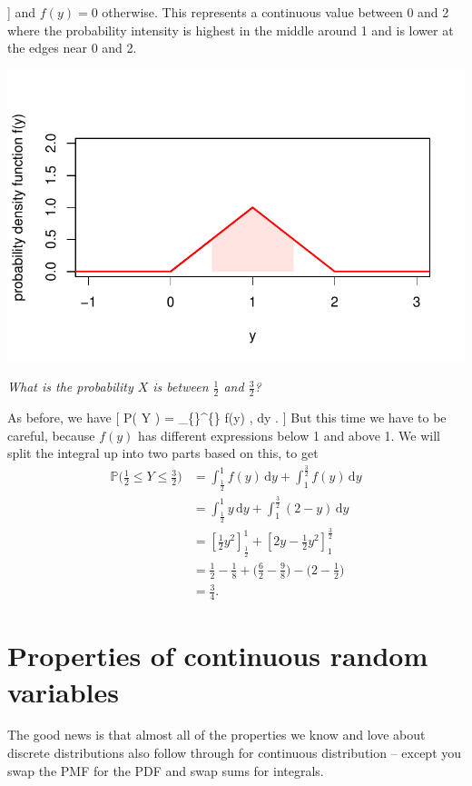 \documentclass[
  letterpaper,
  DIV=11,
  numbers=noendperiod]{scrreprt}
\theoremstyle{remark}
\begin{document}
{]} and \(f(y) = 0\) otherwise. This represents a continuous value
between 0 and 2 where the probability intensity is highest in the middle
around 1 and is lower at the edges near 0 and 2.

\includegraphics{sections/L15-continuous_files/figure-pdf/second-pdf-1.pdf}

\emph{What is the probability \(X\) is between \(\frac12\) and
\(\frac32\)?}

As before, we have {[} \mathbb P\big(  \leq Y \leq {}
\big) = \int\_\{\}\^{}\{\} f(y) , \mathrm dy . {]} But
this time we have to be careful, because \(f(y)\) has different
expressions below 1 and above 1. We will split the integral up into two
parts based on this, to get \begin{align*}
\mathbb P\big( \tfrac12 \leq Y \leq \tfrac32 \big) 
  &= \int_{\frac12}^{1} f(y) \, \mathrm dy + \int_{1}^{\frac32} f(y) \, \mathrm dy \\
    &= \int_{\frac12}^{1} y \, \mathrm dy + \int_{1}^{\frac32} (2-y) \, \mathrm dy \\
    &= \left[ \tfrac12 y^2\right]_{\frac12}^1 + \left[ 2y-\tfrac12 y^2\right]_1^{\frac32} \\
    &= \tfrac12 - \tfrac18 + \big(\tfrac62 - \tfrac98\big) - \big(2 - \tfrac12\big) \\
    &= \tfrac34 .
\end{align*}

\hypertarget{prop-cont}{%
\section{Properties of continuous random variables}\label{prop-cont}}

The good news is that almost all of the properties we know and love
about discrete distributions also follow through for continuous
distribution -- except you swap the PMF for the PDF and swap sums for
integrals.
\end{document}
